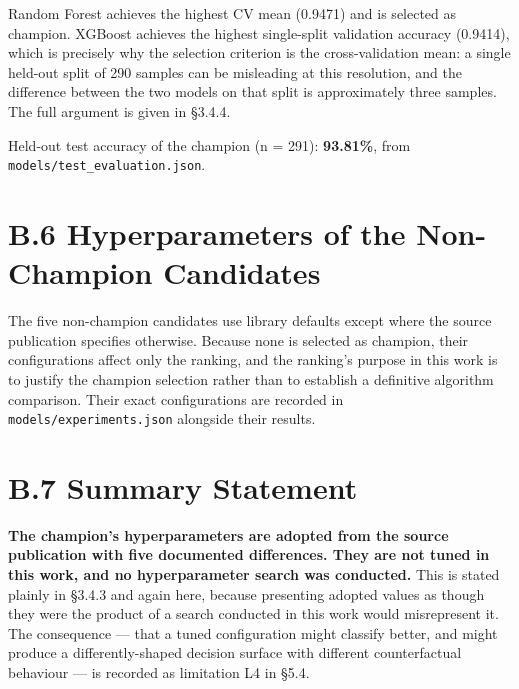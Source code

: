 Random Forest achieves the highest CV mean (0.9471) and is selected as champion. XGBoost achieves the highest single-split validation accuracy (0.9414), which is precisely why the selection criterion is the cross-validation mean: a single held-out split of 290 samples can be misleading at this resolution, and the difference between the two models on that split is approximately three samples. The full argument is given in §3.4.4.

Held-out test accuracy of the champion (n = 291): \textbf{93.81\%}, from \texttt{models/test\_evaluation.json}.

\hypertarget{b.6-hyperparameters-of-the-non-champion-candidates}{%
\section{B.6 Hyperparameters of the Non-Champion Candidates}\label{b.6-hyperparameters-of-the-non-champion-candidates}}

The five non-champion candidates use library defaults except where the source publication specifies otherwise. Because none is selected as champion, their configurations affect only the ranking, and the ranking's purpose in this work is to justify the champion selection rather than to establish a definitive algorithm comparison. Their exact configurations are recorded in \texttt{models/experiments.json} alongside their results.

\hypertarget{b.7-summary-statement}{%
\section{B.7 Summary Statement}\label{b.7-summary-statement}}

\textbf{The champion's hyperparameters are adopted from the source publication with five documented differences. They are not tuned in this work, and no hyperparameter search was conducted.} This is stated plainly in §3.4.3 and again here, because presenting adopted values as though they were the product of a search conducted in this work would misrepresent it. The consequence --- that a tuned configuration might classify better, and might produce a differently-shaped decision surface with different counterfactual behaviour --- is recorded as limitation L4 in §5.4.
